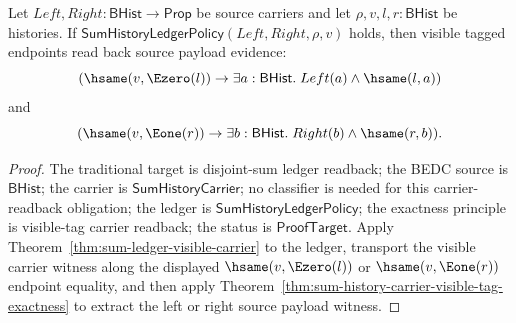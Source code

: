 \begin{theorem}
\label{thm:sum-ledger-visible-payload-readback}
Let $Left,Right:\mathsf{BHist}\to\mathsf{Prop}$ be source carriers and let
$\rho,v,l,r:\mathsf{BHist}$ be histories. If
$\mathsf{SumHistoryLedgerPolicy}(Left,Right,\rho,v)$ holds, then visible tagged
endpoints read back source payload evidence:
$$
(\hsame(v,\Ezero(l))\to\exists a:\mathsf{BHist}.\;Left(a)\land\hsame(l,a))
$$
and
$$
(\hsame(v,\Eone(r))\to\exists b:\mathsf{BHist}.\;Right(b)\land\hsame(r,b)).
$$
\end{theorem}
\begin{proof}
The traditional target is disjoint-sum ledger readback; the BEDC source is
$\mathsf{BHist}$; the carrier is $\mathsf{SumHistoryCarrier}$; no classifier is
needed for this carrier-readback obligation; the ledger is
$\mathsf{SumHistoryLedgerPolicy}$; the exactness principle is visible-tag
carrier readback; the status is $\mathsf{ProofTarget}$. Apply
Theorem~\ref{thm:sum-ledger-visible-carrier} to the ledger, transport the visible
carrier witness along the displayed $\hsame(v,\Ezero(l))$ or
$\hsame(v,\Eone(r))$ endpoint equality, and then apply
Theorem~\ref{thm:sum-history-carrier-visible-tag-exactness} to extract the left
or right source payload witness.
\end{proof}

